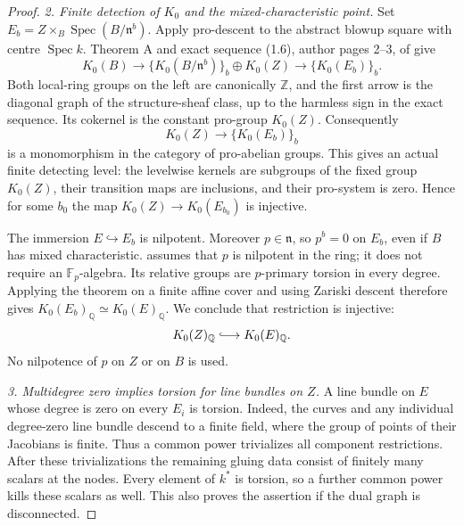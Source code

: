 \begin{proof}
\emph{2. Finite detection of \(K_0\) and the mixed-characteristic point.}
Set \(E_b=Z\times_B\operatorname{Spec}(B/\mathfrak n^b)\).
Apply pro-descent to the abstract blowup square with centre
\(\operatorname{Spec}k\). Theorem A and exact sequence (1.6),
author pages 2--3, of \citet{rootKerzStrunkTamme2018} give
\[
 K_0(B)\longrightarrow
       \{K_0(B/\mathfrak n^b)\}_b\oplus K_0(Z)
       \longrightarrow\{K_0(E_b)\}_b.
\]
Both local-ring groups on the left are canonically \(\mathbb Z\),
and the first arrow is the diagonal graph of the structure-sheaf
class, up to the harmless sign in the exact sequence.
Its cokernel is the constant pro-group \(K_0(Z)\). Consequently
\[
               K_0(Z)\longrightarrow\{K_0(E_b)\}_b
\]
is a monomorphism in the category of pro-abelian groups. This
gives an actual finite detecting level: the levelwise kernels
are subgroups of the fixed group \(K_0(Z)\), their transition
maps are inclusions, and their pro-system is zero. Hence for
some \(b_0\) the map \(K_0(Z)\to K_0(E_{b_0})\) is injective.

The immersion \(E\hookrightarrow E_b\) is nilpotent. Moreover
\(p\in\mathfrak n\), so \(p^b=0\) on \(E_b\), even if \(B\)
has mixed characteristic. \citet[Theorem A, p. 29]
{rootGeisserHesselholt2011} assumes that \(p\) is nilpotent in
the ring; it does not require an \(\mathbb F_p\)-algebra.
Its relative groups are \(p\)-primary torsion in every degree.
Applying the theorem on a finite affine cover and using
Zariski descent \citep[Theorem 8.1, p. 367]
{D_ThomasonTrobaugh1990} therefore gives
\(K_0(E_b)_{\mathbb Q}\simeq K_0(E)_{\mathbb Q}\).
We conclude that restriction is injective:
\begin{equation}\label{eq:C3be-K0-injective}
                         K_0(Z)_{\mathbb Q}
                         \lhook\joinrel\longrightarrow
                         K_0(E)_{\mathbb Q}.
\end{equation}
No nilpotence of \(p\) on \(Z\) or on \(B\) is used.

\emph{3. Multidegree zero implies torsion for line bundles on \(Z\).}
A line bundle on \(E\) whose degree is zero on every \(E_i\)
is torsion. Indeed, the curves and any individual degree-zero
line bundle descend to a finite field, where the group of points
of their Jacobians is finite. Thus a common power trivializes
all component restrictions. After these trivializations the
remaining gluing data consist of finitely many scalars at the
nodes. Every element of \(k^*\) is torsion, so a further common
power kills these scalars as well. This also proves the assertion
if the dual graph is disconnected.


\end{proof}
